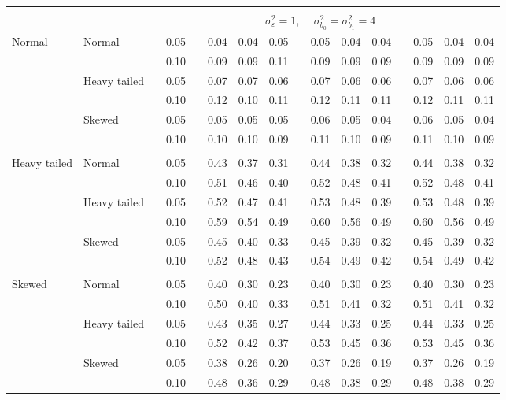 \documentclass{article} %
\begin{document}
\begin{table}[ht]
\begin{scriptsize}
\begin{center}
\begin{tabular}{ll p{.1cm} c p{.1cm} rrr p{.1cm} rrr p{.1cm} rrr}
&&&&&&&&&&&&&&&\\
& && && \multicolumn{9}{c}{$\sigma_{\varepsilon}^2 = 1$, \ \ $\sigma_{b_0}^2 = \sigma_{b_1}^2 = 4$} \\ \cline{6-16}
\rowcolor{gray!20}Normal       & Normal       && 0.05 &&   0.04 & 0.04 & 0.05 && 0.05 & 0.04 & 0.04 && 0.05 & 0.04 & 0.04 \\ 
\rowcolor{gray!20}             &              && 0.10 &&   0.09 & 0.09 & 0.11 && 0.09 & 0.09 & 0.09 && 0.09 & 0.09 & 0.09 \\ 
\rowcolor{gray!20}             & Heavy tailed && 0.05 &&   0.07 & 0.07 & 0.06 && 0.07 & 0.06 & 0.06 && 0.07 & 0.06 & 0.06 \\ 
\rowcolor{gray!20}             &              && 0.10 &&   0.12 & 0.10 & 0.11 && 0.12 & 0.11 & 0.11 && 0.12 & 0.11 & 0.11 \\ 
\rowcolor{gray!20}             & Skewed       && 0.05 &&   0.05 & 0.05 & 0.05 && 0.06 & 0.05 & 0.04 && 0.06 & 0.05 & 0.04 \\ 
\rowcolor{gray!20}             &              && 0.10 &&   0.10 & 0.10 & 0.09 && 0.11 & 0.10 & 0.09 && 0.11 & 0.10 & 0.09 \\ 
             &&&&&&&&&&&&&&&\\
Heavy tailed & Normal       && 0.05 &&   0.43 & 0.37 & 0.31 && 0.44 & 0.38 & 0.32 && 0.44 & 0.38 & 0.32 \\ 
             &              && 0.10 &&   0.51 & 0.46 & 0.40 && 0.52 & 0.48 & 0.41 && 0.52 & 0.48 & 0.41 \\ 
             & Heavy tailed && 0.05 &&   0.52 & 0.47 & 0.41 && 0.53 & 0.48 & 0.39 && 0.53 & 0.48 & 0.39 \\ 
             &              && 0.10 &&   0.59 & 0.54 & 0.49 && 0.60 & 0.56 & 0.49 && 0.60 & 0.56 & 0.49 \\ 
             & Skewed       && 0.05 &&   0.45 & 0.40 & 0.33 && 0.45 & 0.39 & 0.32 && 0.45 & 0.39 & 0.32 \\ 
             &              && 0.10 &&   0.52 & 0.48 & 0.43 && 0.54 & 0.49 & 0.42 && 0.54 & 0.49 & 0.42 \\ 
             &&&&&&&&&&&&&&&\\
Skewed       & Normal       && 0.05 &&   0.40 & 0.30 & 0.23 && 0.40 & 0.30 & 0.23 && 0.40 & 0.30 & 0.23 \\ 
             &              && 0.10 &&   0.50 & 0.40 & 0.33 && 0.51 & 0.41 & 0.32 && 0.51 & 0.41 & 0.32 \\ 
             & Heavy tailed && 0.05 &&   0.43 & 0.35 & 0.27 && 0.44 & 0.33 & 0.25 && 0.44 & 0.33 & 0.25 \\ 
             &              && 0.10 &&   0.52 & 0.42 & 0.37 && 0.53 & 0.45 & 0.36 && 0.53 & 0.45 & 0.36 \\ 
             & Skewed       && 0.05 &&   0.38 & 0.26 & 0.20 && 0.37 & 0.26 & 0.19 && 0.37 & 0.26 & 0.19 \\ 
             &              && 0.10 &&   0.48 & 0.36 & 0.29 && 0.48 & 0.38 & 0.29 && 0.48 & 0.38 & 0.29 \\ 



\end{tabular}
\end{center}
\end{scriptsize}
\end{table}
\end{document}
